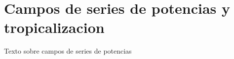 \section{Campos de series de potencias y tropicalizacion}
\label{sec:campos-series-potencias}
Texto sobre campos de series de potencias
